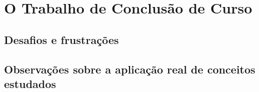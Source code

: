 \chapter{O Trabalho de Conclusão de Curso}
\label{cap:o_tcc}

\section{Desafios e frustrações}
\label{sec:desafios_frustacoes}

\section{Observações sobre a aplicação real de conceitos estudados}
\label{sec:observacoes_sobre_aplicacao_real}
